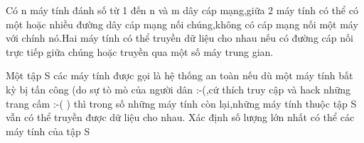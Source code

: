 Có n máy tính đánh số từ 1 đến n và m dây cáp mạng,giữa 2 máy tính có thể có một hoặc nhiều đường dây cáp mạng nối chúng,không có cáp mạng nối một máy với chính nó.Hai máy tính có thể truyền dữ liệu cho nhau nếu có đường cáp nối trực tiếp giữa chúng hoặc truyền qua một số máy trung gian.  

   Một tập S các máy tính được gọi là hệ thống an toàn nếu dù một máy tính bất kỳ bị tấn công (do sự tò mò của người dân :-(,cứ thích truy cập và hack những trang cấm :-( ) thì trong số những máy tính còn lại,những máy tính thuộc tập S vẫn có thể truyền được dữ liệu cho nhau. Xác định số lượng lớn nhất có thể các máy tính của tập S